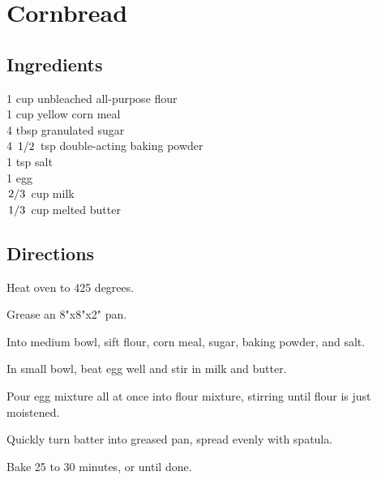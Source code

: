 \documentclass{article}
\newcounter{qcounter}
\begin{document}
\newcommand{\slfrac}[2]{\left.#1\middle/#2\right.}
\newcommand{\degree}{\ensuremath{^\circ}}

\section*{Cornbread}

\subsection*{Ingredients}
1 cup unbleached all-purpose flour\\
1 cup yellow corn meal\\
4 tbsp granulated sugar\\
4 $\slfrac{1}{2}$ tsp double-acting baking powder\\
1 tsp salt\\
1 egg\\
$\slfrac{2}{3}$ cup milk\\
$\slfrac{1}{3}$ cup melted butter\\

\subsection*{Directions}
\begin{list}{:~}{}
\item Heat oven to 425 degrees.
\item Grease an 8"x8"x2" pan.
\item Into medium bowl, sift flour, corn meal, sugar, baking powder, and salt.
\item In small bowl, beat egg well and stir in milk and butter.
\item Pour egg mixture all at once into flour mixture, stirring until flour is just moistened.
\item Quickly turn batter into greased pan, spread evenly with spatula.
\item Bake 25 to 30 minutes, or until done.

\end{list}
\end{document}

